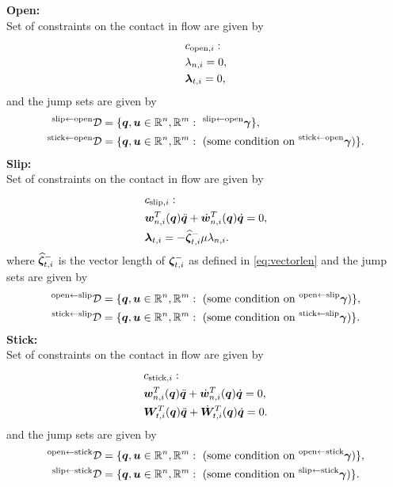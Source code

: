 \documentclass[DC2017114Bouma.tex]{subfiles}
\begin{document}
\textbf{Open:}\\
Set of constraints on the contact in flow are given by
\begin{align}
&c_{\text{open},i}:\nonumber\\
&\lambda_{n,i} = 0,\\
&\boldsymbol{\lambda}_{t,i} = 0,
\end{align}
and the jump sets are given by
\begin{align}
^{\text{slip}\leftarrow \text{open}}\mathcal{D} &= \{{\boldsymbol{q}},{\boldsymbol{u}}\in\mathbb{R}^n,\mathbb{R}^m:\ ^{\text{slip}\leftarrow \text{open}}\boldsymbol{\gamma} \},\label{eq:D0to1}\\
^{\text{stick}\leftarrow \text{open}}\mathcal{D} &= \{{\boldsymbol{q}},{\boldsymbol{u}}\in\mathbb{R}^n,\mathbb{R}^m:\ (\text{some condition on } ^{\text{stick}\leftarrow \text{open}}\boldsymbol{\gamma}) \}.\label{eq:D0to2}
\end{align}
\textbf{Slip:}\\
Set of constraints on the contact in flow are given by
\begin{align}
&c_{\text{slip},i}:\nonumber\\
&{\boldsymbol{w}}^T_{n,i}({\boldsymbol{q}})\ddot{{\boldsymbol{q}}} + \dot{{\boldsymbol{w}}}^T_{n,i}({\boldsymbol{q}})\dot{{\boldsymbol{q}}} = 0,\\
&\boldsymbol{\lambda}_{t,i} = -\widehat{\boldsymbol{\zeta}}^-_{t,i}\mu\lambda_{n,i}.
\end{align}
where $\widehat{\boldsymbol{\zeta}}^-_{t,i}$ is the vector length of $\boldsymbol{\zeta}^-_{t,i}$ as defined in \eqref{eq:vectorlen} and the jump sets are given by
\begin{align}
^{\text{open}\leftarrow \text{slip}}\mathcal{D} &= \{{\boldsymbol{q}},{\boldsymbol{u}}\in\mathbb{R}^n,\mathbb{R}^m:\ (\text{some condition on } ^{\text{open}\leftarrow \text{slip}}\boldsymbol{\gamma}) \},\\
^{\text{stick}\leftarrow \text{slip}}\mathcal{D} &= \{{\boldsymbol{q}},{\boldsymbol{u}}\in\mathbb{R}^n,\mathbb{R}^m:\ (\text{some condition on } ^{\text{stick}\leftarrow \text{slip}}\boldsymbol{\gamma}) \}.
\end{align}
\textbf{Stick:}\\
Set of constraints on the contact in flow are given by
\begin{align}
&c_{\text{stick},i}:\nonumber\\
&{\boldsymbol{w}}^T_{n,i}({\boldsymbol{q}})\ddot{{\boldsymbol{q}}} + \dot{{\boldsymbol{w}}}^T_{n,i}({\boldsymbol{q}})\dot{{\boldsymbol{q}}} = 0,\\
&{\boldsymbol{W}}^T_{t,i}({\boldsymbol{q}})\ddot{{\boldsymbol{q}}} + \dot{{\boldsymbol{W}}}^T_{t,i}({\boldsymbol{q}})\dot{{\boldsymbol{q}}} = 0.
\end{align}
and the jump sets are given by
\begin{align}
^{\text{open}\leftarrow \text{stick}}\mathcal{D} &= \{{\boldsymbol{q}},{\boldsymbol{u}}\in\mathbb{R}^n,\mathbb{R}^m:\ (\text{some condition on } ^{\text{open}\leftarrow \text{stick}}\boldsymbol{\gamma}) \},\\
^{\text{slip}\leftarrow \text{stick}}\mathcal{D} &= \{{\boldsymbol{q}},{\boldsymbol{u}}\in\mathbb{R}^n,\mathbb{R}^m:\ (\text{some condition on } ^{\text{slip}\leftarrow \text{stick}}\boldsymbol{\gamma}) \}.
\end{align}
\end{document}
